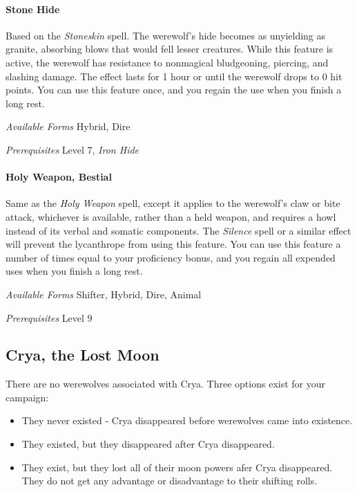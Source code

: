 \documentclass[twocolumn]{dndbook}
\begin{document}
\paragraph*{Stone Hide}
Based on the \emph{Stoneskin} spell.
The werewolf's hide becomes as unyielding as granite, absorbing blows that would fell lesser creatures.
While this feature is active, the werewolf has resistance to nonmagical bludgeoning, piercing, and slashing damage.
The effect lasts for 1 hour or until the werewolf drops to 0 hit points.
You can use this feature once, and you regain the use when you finish a long rest.\par
\emph{Available Forms} Hybrid, Dire\par
\emph{Prerequisites} Level 7, \emph{Iron Hide}\par

\paragraph*{Holy Weapon, Bestial}
Same as the \emph{Holy Weapon} spell, except it applies to the werewolf's claw or bite attack, whichever is available, rather than a held weapon, and requires a howl instead of its verbal and somatic components.
The \emph{Silence} spell or a similar effect will prevent the lycanthrope from using this feature.
You can use this feature a number of times equal to your proficiency bonus, and you regain all expended uses when you finish a long rest.\par
\emph{Available Forms} Shifter, Hybrid, Dire, Animal\par
\emph{Prerequisites} Level 9\par


\subsection*{Crya, the Lost Moon}

There are no werewolves associated with Crya. Three options exist for your campaign:
\begin{itemize}
    \item They never existed - Crya disappeared before werewolves came into existence.
    \item They existed, but they disappeared after Crya disappeared.
    \item They exist, but they lost all of their moon powers afer Crya disappeared. They do not get any advantage or disadvantage to their shifting rolls.
\end{itemize}
\end{document}
